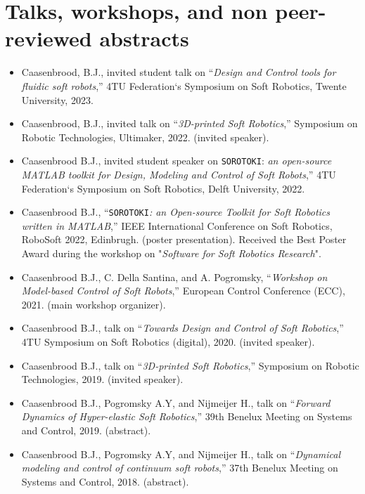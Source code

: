 \section*{Talks, workshops, and non peer-reviewed abstracts}
\begin{itemize}[leftmargin=2mm]
\small
\setlength\itemsep{0.0em}
\item Caasenbrood, B.J., invited student talk on  “\textit{Design and Control tools for fluidic soft robots},” 4TU Federation`s Symposium on Soft Robotics, Twente University, 2023.
\item Caasenbrood, B.J., invited talk on “\textit{3D-printed Soft Robotics},” Symposium on Robotic Technologies, Ultimaker, 2022. (invited speaker).
\item Caasenbrood B.J., invited student speaker on \texttt{SOROTOKI}: \textit{an open-source MATLAB toolkit for Design, Modeling and Control of Soft Robots},”  4TU Federation`s Symposium on Soft Robotics, Delft University, 2022.
\item Caasenbrood B.J., “\texttt{SOROTOKI}\textit{: an Open-source Toolkit for Soft Robotics written in MATLAB},”  IEEE International Conference on Soft Robotics, RoboSoft 2022, Edinbrugh. (poster presentation). Received the Best Poster Award during the workshop on "\textit{Software for Soft Robotics Research}". 
\item Caasenbrood B.J., C. Della Santina, and A. Pogromsky, “\textit{Workshop on Model-based Control of Soft Robots},” European Control Conference (ECC), 2021. (main workshop organizer).
\item Caasenbrood B.J., talk on  “\textit{Towards Design and Control of Soft Robotics},” 4TU Symposium on Soft Robotics (digital), 2020. (invited speaker).
\item Caasenbrood B.J., talk on  “\textit{3D-printed Soft Robotics},” Symposium on Robotic Technologies, 2019. (invited speaker).
\item Caasenbrood B.J., Pogromsky A.Y, and Nijmeijer H., talk on  “\textit{Forward Dynamics of Hyper-elastic Soft Robotics},” 39th Benelux Meeting on Systems and Control, 2019. (abstract).
\item Caasenbrood B.J., Pogromsky A.Y, and Nijmeijer H., talk on  “\textit{Dynamical modeling and control of continuum soft robots},” 37th Benelux Meeting on Systems and Control, 2018. (abstract).
\end{itemize}
